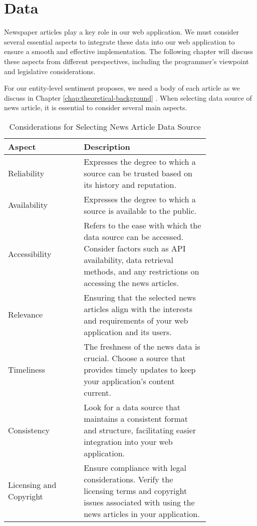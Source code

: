\chapter{Data}
\label{chap:data}

Newspaper articles play a key role in our web application. We must consider several essential aspects to integrate these data into our web application to ensure a smooth and effective implementation. The following chapter will discuss these aspects from different perspectives, including the programmer's viewpoint and legislative considerations. 

For our entity-level sentiment proposes, we need a body of each article as we discuss in Chapter \ref{chap:theoretical-background} . 
When selecting data source of news article, it is essential to consider several main aspects.

\begin{table}[htbp]
    \caption{Considerations for Selecting News Article Data Source}
    \centering
    \begin{tabular}{p{0.3\linewidth}p{0.5\linewidth}}
        \toprule
        \textbf{Aspect} & \textbf{Description} \\
        \midrule
        Reliability & Expresses the degree to which a source can be trusted based on its history and reputation. \\
        \hline
        Availability & Expresses the degree to which a source is available to the public. \\
        \hline
        Accessibility & Refers to the ease with which the data source can be accessed. Consider factors such as API availability, data retrieval methods, and any restrictions on accessing the news articles. \\
        \hline
        Relevance & Ensuring that the selected news articles align with the interests and requirements of your web application and its users. \\
        \hline
        Timeliness & The freshness of the news data is crucial. Choose a source that provides timely updates to keep your application's content current. \\
        \hline
        Consistency & Look for a data source that maintains a consistent format and structure, facilitating easier integration into your web application. \\
        \hline
        Licensing and Copyright & Ensure compliance with legal considerations. Verify the licensing terms and copyright issues associated with using the news articles in your application. \\
        \bottomrule
    \end{tabular}
\end{table}

